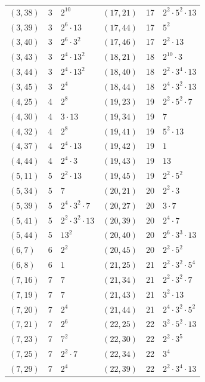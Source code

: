 \documentclass[11pt]{article}
\begin{document}
\begin{longtable}{@{}lrl@{\qquad}lrl@{}}
$(3,38)$ & 3 & $2^{10}$ & $(17,21)$ & 17 & $2^{2}\cdot 5^{2}\cdot 13$\\
$(3,39)$ & 3 & $2^{6}\cdot 13$ & $(17,44)$ & 17 & $5^{2}$\\
$(3,40)$ & 3 & $2^{6}\cdot 3^{2}$ & $(17,46)$ & 17 & $2^{2}\cdot 13$\\
$(3,43)$ & 3 & $2^{4}\cdot 13^{2}$ & $(18,21)$ & 18 & $2^{10}\cdot 3$\\
$(3,44)$ & 3 & $2^{4}\cdot 13^{2}$ & $(18,40)$ & 18 & $2^{2}\cdot 3^{4}\cdot 13$\\
$(3,45)$ & 3 & $2^{4}$ & $(18,44)$ & 18 & $2^{4}\cdot 3^{2}\cdot 13$\\
$(4,25)$ & 4 & $2^{8}$ & $(19,23)$ & 19 & $2^{2}\cdot 5^{2}\cdot 7$\\
$(4,30)$ & 4 & $3\cdot 13$ & $(19,34)$ & 19 & $7$\\
$(4,32)$ & 4 & $2^{8}$ & $(19,41)$ & 19 & $5^{2}\cdot 13$\\
$(4,37)$ & 4 & $2^{4}\cdot 13$ & $(19,42)$ & 19 & $1$\\
$(4,44)$ & 4 & $2^{4}\cdot 3$ & $(19,43)$ & 19 & $13$\\
$(5,11)$ & 5 & $2^{2}\cdot 13$ & $(19,45)$ & 19 & $2^{2}\cdot 5^{2}$\\
$(5,34)$ & 5 & $7$ & $(20,21)$ & 20 & $2^{2}\cdot 3$\\
$(5,39)$ & 5 & $2^{4}\cdot 3^{2}\cdot 7$ & $(20,27)$ & 20 & $3\cdot 7$\\
$(5,41)$ & 5 & $2^{2}\cdot 3^{2}\cdot 13$ & $(20,39)$ & 20 & $2^{4}\cdot 7$\\
$(5,44)$ & 5 & $13^{2}$ & $(20,40)$ & 20 & $2^{6}\cdot 3^{3}\cdot 13$\\
$(6,7)$ & 6 & $2^{2}$ & $(20,45)$ & 20 & $2^{2}\cdot 5^{2}$\\
$(6,8)$ & 6 & $1$ & $(21,25)$ & 21 & $2^{2}\cdot 3^{2}\cdot 5^{4}$\\
$(7,16)$ & 7 & $7$ & $(21,34)$ & 21 & $2^{2}\cdot 3^{2}\cdot 7$\\
$(7,19)$ & 7 & $7$ & $(21,43)$ & 21 & $3^{2}\cdot 13$\\
$(7,20)$ & 7 & $2^{4}$ & $(21,44)$ & 21 & $2^{4}\cdot 3^{2}\cdot 5^{2}$\\
$(7,21)$ & 7 & $2^{6}$ & $(22,25)$ & 22 & $3^{2}\cdot 5^{2}\cdot 13$\\
$(7,23)$ & 7 & $7^{2}$ & $(22,30)$ & 22 & $2^{2}\cdot 3^{5}$\\
$(7,25)$ & 7 & $2^{2}\cdot 7$ & $(22,34)$ & 22 & $3^{4}$\\
$(7,29)$ & 7 & $2^{4}$ & $(22,39)$ & 22 & $2^{2}\cdot 3^{4}\cdot 13$\\

\end{longtable}
\end{document}
